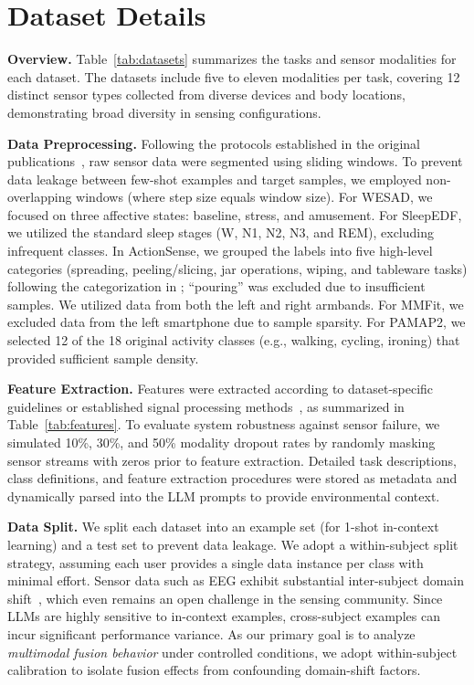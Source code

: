 \section{Dataset Details}
\label{sec:appendix_dataset}




\noindent \textbf{Overview.} Table~\ref{tab:datasets} summarizes the tasks and sensor modalities for each dataset. The datasets include five to eleven modalities per task, covering 12 distinct sensor types collected from diverse devices and body locations, demonstrating broad diversity in sensing configurations.

\noindent \textbf{Data Preprocessing.} Following the protocols established in the original publications~\citep{wesad, sleepedf, actionsense, mmfit, pamap2}, raw sensor data were segmented using sliding windows. To prevent data leakage between few-shot examples and target samples, we employed non-overlapping windows (where step size equals window size). For WESAD, we focused on three affective states: baseline, stress, and amusement. For SleepEDF, we utilized the standard sleep stages (W, N1, N2, N3, and REM), excluding infrequent classes. In ActionSense, we grouped the labels into five high-level categories (spreading, peeling/slicing, jar operations, wiping, and tableware tasks) following the categorization in \citet{actionsense}; ``pouring'' was excluded due to insufficient samples. We utilized data from both the left and right armbands. For MMFit, we excluded data from the left smartphone due to sample sparsity. For PAMAP2, we selected 12 of the 18 original activity classes (e.g., walking, cycling, ironing) that provided sufficient sample density.



\noindent \textbf{Feature Extraction.} Features were extracted according to dataset-specific guidelines or established signal processing methods~\citep{wesad, sleepedf_features}, as summarized in Table~\ref{tab:features}. To evaluate system robustness against sensor failure, we simulated 10\%, 30\%, and 50\% modality dropout rates by randomly masking sensor streams with zeros prior to feature extraction. Detailed task descriptions, class definitions, and feature extraction procedures were stored as metadata and dynamically parsed into the LLM prompts to provide environmental context.

\noindent \textbf{Data Split.} We split each dataset into an example set (for 1-shot in-context learning) and a test set to prevent data leakage. We adopt a within-subject split strategy, assuming each user provides a single data instance per class with minimal effort. Sensor data such as EEG exhibit substantial inter-subject domain shift~\citep{eegdomainshift, domainshift}, which even remains an open challenge in the sensing community. Since LLMs are highly sensitive to in-context examples, cross-subject examples can incur significant performance variance. As our primary goal is to analyze \textit{multimodal fusion behavior} under controlled conditions, we adopt within-subject calibration to isolate fusion effects from confounding domain-shift factors.

